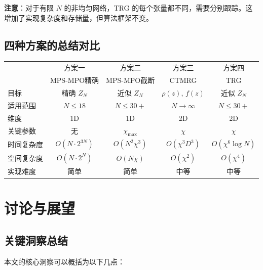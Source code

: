\documentclass[12pt,a4paper]{ctexart}
\begin{document}
\textbf{注意}：对于有限 $N$ 的非均匀网络，TRG 的每个张量都不同，需要分别跟踪。这增加了实现复杂度和存储量，但算法框架不变。

\subsection{四种方案的总结对比}

\begin{center}
\begin{tabular}{p{2.5cm}cccc}
\toprule
 & 方案一 & 方案二 & 方案三 & 方案四 \\
 & MPS-MPO精确 & MPS-MPO截断 & CTMRG & TRG \\
\midrule
目标 & 精确 $Z_N$ & 近似 $Z_N$ & $\rho(z)$, $f(z)$ & 近似 $Z_N$ \\
适用范围 & $N \leq 18$ & $N \leq 30+$ & $N \to \infty$ & $N \leq 30+$ \\
维度 & 1D & 1D & 2D & 2D \\
关键参数 & 无 & $\chi_{\max}$ & $\chi$ & $\chi$ \\
时间复杂度 & $O(N \cdot 2^{3N})$ & $O(N^2 \chi^3)$ & $O(\chi^3 D^3)$ & $O(\chi^6 \log N)$ \\
空间复杂度 & $O(N \cdot 2^N)$ & $O(N \chi)$ & $O(\chi^2)$ & $O(\chi^4)$ \\
实现难度 & 简单 & 简单 & 中等 & 中等 \\
\bottomrule
\end{tabular}
\end{center}


\section{讨论与展望}

\subsection{关键洞察总结}

本文的核心洞察可以概括为以下几点：
\end{document}
